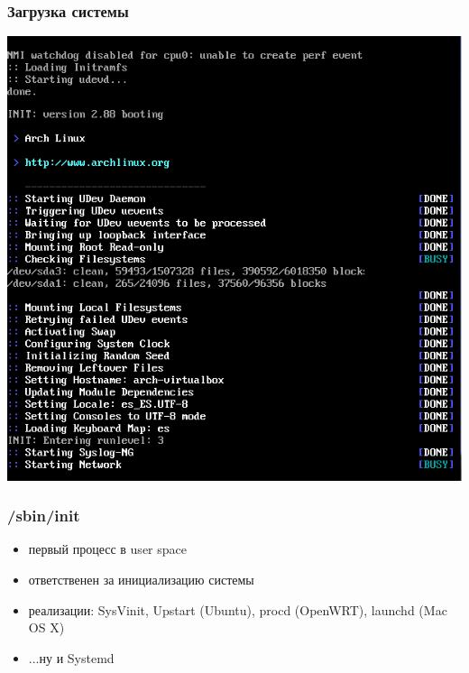 \documentclass[aspectratio=169]{beamer}
\begin{document}
\begin{frame}
  \frametitle{Загрузка системы}
  \includegraphics[scale=0.33]{img2/archlinux-boot.png}
\end{frame}


\begin{frame}
  \frametitle{/sbin/init}

  \begin{itemize}
  \item первый процесс в user space
  \item ответственен за инициализацию системы
  \item реализации: SysVinit, Upstart (Ubuntu), procd (OpenWRT), launchd (Mac OS X)
  \item ...ну и Systemd
  \end{itemize}

\end{frame}
\end{document}
